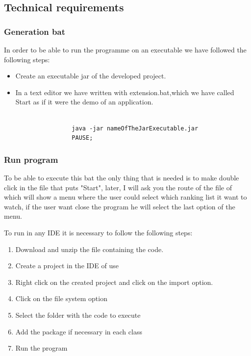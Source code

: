 \documentclass[a4paper]{article}
\theoremstyle{plain}
\theoremstyle{definition}
\begin{document}
    \subsection{Technical requirements}
        \subsubsection{Generation bat}
            In order to be able to run the programme on an executable we have followed the following steps:
        \begin{itemize}
            \item Create an executable jar of the developed project. 
            \item In a text editor we have written with extension.bat,which we have called Start as if it were the demo of an application.
                \begin{verbatim}

                java -jar nameOfTheJarExecutable.jar
                PAUSE;

                \end{verbatim}
        \end{itemize}
        \subsubsection{Run program}
	     To be able to execute this bat the only thing that is needed is to make double click in the file that puts "Start", later, I will ask you the route of the file of which will show a menu where the user could select which ranking list it want to watch, if the user want close the program he will select the last option of the menu.\newline
	
        To run in any IDE it is necessary to follow the following steps:
        \begin{enumerate}
            \item Download and unzip the file containing the code.
            \item Create a project in the IDE of use
            \item Right click on the created project and click on the import option. 
            \item Click on the file system option 
            \item Select the folder with the code to execute
            \item Add the package if necessary in each class
            \item Run the program
        \end{enumerate}
        

        
        
	

	
	
\end{document}
